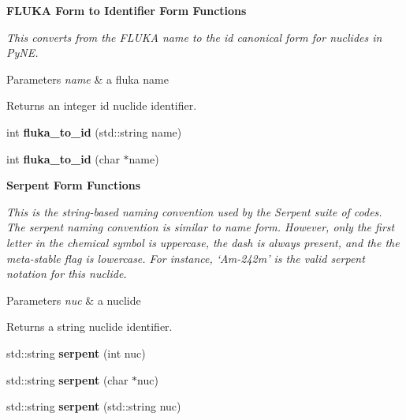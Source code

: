 \begin{Indent}{\bf F\+L\+U\+K\+A Form to Identifier Form Functions}\par
{\em This converts from the F\+L\+U\+K\+A name to the id canonical form for nuclides in Py\+N\+E. 
\begin{DoxyParams}{Parameters}
{\em name} & a fluka name \\
\hline
\end{DoxyParams}
\begin{DoxyReturn}{Returns}
an integer id nuclide identifier. 
\end{DoxyReturn}
}\begin{DoxyCompactItemize}
\item 
\hypertarget{namespacepyne_1_1nucname_a9938dd663fa7160312e033ea088423b8}{int {\bfseries fluka\+\_\+to\+\_\+id} (std\+::string name)}\label{namespacepyne_1_1nucname_a9938dd663fa7160312e033ea088423b8}

\item 
\hypertarget{namespacepyne_1_1nucname_a5df41bf3c3d1b907a89c49a2485b6b68}{int {\bfseries fluka\+\_\+to\+\_\+id} (char $\ast$name)}\label{namespacepyne_1_1nucname_a5df41bf3c3d1b907a89c49a2485b6b68}

\end{DoxyCompactItemize}
\end{Indent}
\begin{Indent}{\bf Serpent Form Functions}\par
{\em This is the string-\/based naming convention used by the Serpent suite of codes. The serpent naming convention is similar to name form. However, only the first letter in the chemical symbol is uppercase, the dash is always present, and the the meta-\/stable flag is lowercase. For instance, ‘\+Am-\/242m’ is the valid serpent notation for this nuclide. 
\begin{DoxyParams}{Parameters}
{\em nuc} & a nuclide \\
\hline
\end{DoxyParams}
\begin{DoxyReturn}{Returns}
a string nuclide identifier. 
\end{DoxyReturn}
}\begin{DoxyCompactItemize}
\item 
\hypertarget{namespacepyne_1_1nucname_add93b13ec55e918550681062e48e1fd2}{std\+::string {\bfseries serpent} (int nuc)}\label{namespacepyne_1_1nucname_add93b13ec55e918550681062e48e1fd2}

\item 
\hypertarget{namespacepyne_1_1nucname_aea4d37bd112080cafb72d7e56fc2c555}{std\+::string {\bfseries serpent} (char $\ast$nuc)}\label{namespacepyne_1_1nucname_aea4d37bd112080cafb72d7e56fc2c555}

\item 
\hypertarget{namespacepyne_1_1nucname_a6c17212425ae2bc60437fa5c96f0b8de}{std\+::string {\bfseries serpent} (std\+::string nuc)}\label{namespacepyne_1_1nucname_a6c17212425ae2bc60437fa5c96f0b8de}

\end{DoxyCompactItemize}
\end{Indent}
